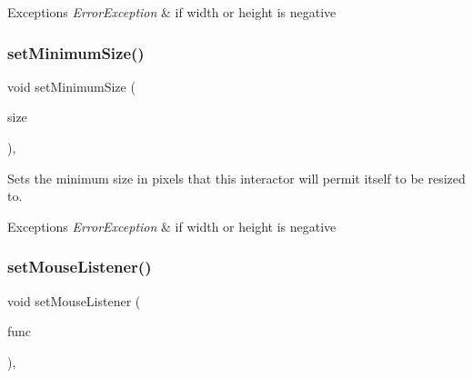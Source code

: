 \begin{DoxyExceptions}{Exceptions}
{\em Error\+Exception} & if width or height is negative \\
\hline
\end{DoxyExceptions}
\mbox{\label{classGInteractor_a3b1046117ac6cb7abe467e00ba8a81f4}} 
\subsubsection{\texorpdfstring{set\+Minimum\+Size()}{setMinimumSize()}\hspace{0.1cm}{\footnotesize\ttfamily [2/2]}}
{\footnotesize\ttfamily void set\+Minimum\+Size (\begin{DoxyParamCaption}\item[{const \mbox{\hyperlink{structGDimension}{G\+Dimension}} \&}]{size }\end{DoxyParamCaption})\hspace{0.3cm}{\ttfamily [virtual]}, {\ttfamily [inherited]}}



Sets the minimum size in pixels that this interactor will permit itself to be resized to. 


\begin{DoxyExceptions}{Exceptions}
{\em Error\+Exception} & if width or height is negative \\
\hline
\end{DoxyExceptions}
\mbox{\label{classGInteractor_a37d8dbc943f59920f705b0104f60bde2}} 
\subsubsection{\texorpdfstring{set\+Mouse\+Listener()}{setMouseListener()}\hspace{0.1cm}{\footnotesize\ttfamily [1/2]}}
{\footnotesize\ttfamily void set\+Mouse\+Listener (\begin{DoxyParamCaption}\item[{G\+Event\+Listener}]{func }\end{DoxyParamCaption})\hspace{0.3cm}{\ttfamily [virtual]}, {\ttfamily [inherited]}}



